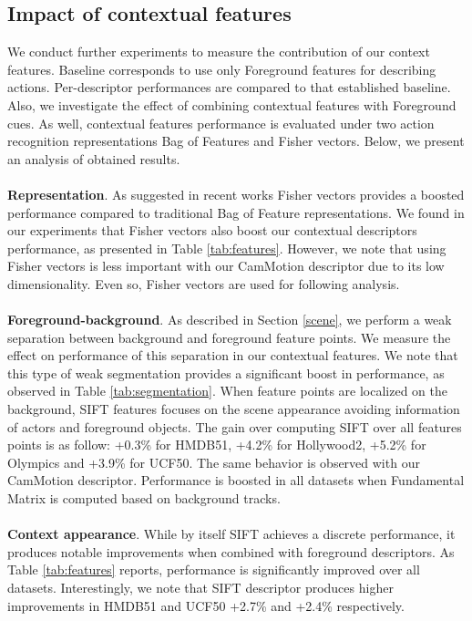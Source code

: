\subsection{Impact of contextual features}
We conduct further experiments to measure the  contribution of our context features. Baseline corresponds to use only Foreground features for describing actions. Per-descriptor performances are compared to that established baseline. Also, we investigate the effect of combining contextual features with Foreground cues. As well, contextual features performance is evaluated under two action recognition representations \ie Bag of Features and Fisher vectors. Below, we present an analysis of obtained results.\\\\
\textbf{Representation}. As suggested in recent works \cite{perronnin2010, wang2013, xwang2013} Fisher vectors provides a boosted performance compared to traditional Bag of Feature representations. We found in our experiments that Fisher vectors also boost our contextual descriptors performance, as presented in Table \ref{tab:features}. However, we note that using Fisher vectors is less important with our CamMotion descriptor due to its low dimensionality. Even so, Fisher vectors are used for following analysis.\\\\
\textbf{Foreground-background}. As described in Section \ref{scene}, we perform a weak separation between background and foreground feature points. We measure the effect on performance of this separation in our contextual features. We note that this type of weak segmentation provides a significant boost in performance, as observed in Table \ref{tab:segmentation}. When feature points are localized on the background, SIFT features focuses on the scene appearance avoiding information of actors and foreground objects. The gain over computing SIFT over all features points is as follow: +0.3\% for HMDB51, +4.2\% for Hollywood2, +5.2\% for Olympics and +3.9\% for UCF50. The same behavior is observed with our CamMotion descriptor. Performance is boosted in all datasets when Fundamental Matrix is computed based on background tracks.\\\\
\textbf{Context appearance}. While by itself SIFT achieves a discrete performance, it produces notable improvements when combined with foreground descriptors. As Table \ref{tab:features} reports, performance is significantly improved over all datasets. Interestingly, we note that SIFT descriptor produces higher improvements in HMDB51 and UCF50 \ie +2.7\% and +2.4\% respectively.\\\\
